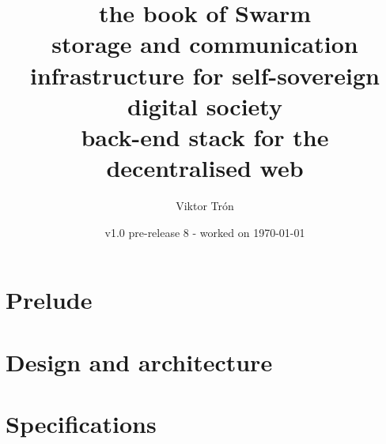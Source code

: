 \documentclass[a4paper,12pt,openany,hyperfootnotes,hidelinks]{scrbook}
\title{\Huge\sc the book of Swarm\\
\Large storage and communication infrastructure for self-sovereign digital society\\
back-end stack for the decentralised web}
\author{Viktor Trón}
\date{v1.0 pre-release 8 - worked on \today}
\newif\ifdraft
\begin{document}
\frontmatter
\maketitle
\setcounter{tocdepth}{2}


\ifdraft
Instructions for compiling and distributing.

These are hidden if conditional text is not shown (when publishing a version).

\begin{enumerate}
    \item any version being worked on should be named "Version vX - worked on";
    \item when publishing, "worked on" should be removed; 
    \item drafttrue line should be commented out removing conditional text upon compilation;
    \item PDF should be generated, saved and pushed to Github repo \\ (https://github.com/ethersphere/publish-bookofswarm/tree/master/pdfs); \item verify that last commit was autodeployed to Swarm \\ (https://swarm-gateways.net/bzz:/latest.bookofswarm.eth/the-book-of-swarm-viktor-tron.pdf);
    \item PDF commit in Github repo should be named with version number;
    \item version number in Latex should be bumped up and "worked on" note added: "Version v(X+1) - worked on";
    \item Goto 1.
\end{enumerate}
\fi


\tableofcontents
\listoffigures

\label{sec:toc}
 
\mainmatter
\part{Prelude} \label{part:preface}

\part{Design and architecture} \label{part:designarchitecture}

\part{Specifications}
\label{part:specifications}

{}

\appendix
\end{document}
